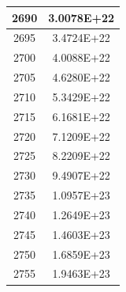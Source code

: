 \documentclass[a4paper]{article}
\begin{document}
\begin{tabular}{|c|c|}
		\hline
		2690 & 3.0078E+22 \\
		\hline
		2695 & 3.4724E+22 \\
		\hline
		2700 & 4.0088E+22 \\
		\hline
		2705 & 4.6280E+22 \\
		\hline
		2710 & 5.3429E+22 \\
		\hline
		2715 & 6.1681E+22 \\
		\hline
		2720 & 7.1209E+22 \\
		\hline
		2725 & 8.2209E+22 \\
		\hline
		2730 & 9.4907E+22 \\
		\hline
		2735 & 1.0957E+23 \\
		\hline
		2740 & 1.2649E+23 \\
		\hline
		2745 & 1.4603E+23 \\
		\hline
		2750 & 1.6859E+23 \\
		\hline
		2755 & 1.9463E+23 \\
		\hline
	\end{tabular}
	\hfill
\end{document}
